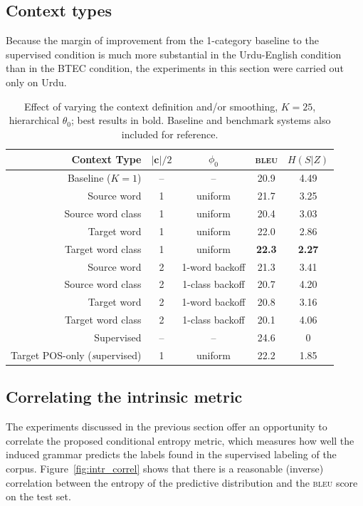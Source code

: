 \subsection{Context types}

Because the margin of improvement from the 1-category baseline to the supervised condition is much more substantial in the Urdu-English condition than in the BTEC condition, the experiments in this section were carried out only on Urdu.


\begin{table}[h]
\caption{Effect of varying the context definition and/or smoothing, $K=25$, hierarchical $\theta_0$; best results in bold. Baseline and benchmark systems also included for reference.}
\begin{center}
\begin{tabular}{r|c|c|c|c}
Context Type & $|\textbf{c}|/2$ & $\phi_0$ & \textsc{bleu} & $H(S|Z)$ \\
\hline
Baseline ($K=1$) & -- & -- & 20.9 &  4.49 \\
\hline
Source word & 1 & uniform & 21.7 & 3.25 \\
Source word class & 1 & uniform & 20.4 & 3.03 \\
Target word & 1 & uniform & 22.0 & 2.86 \\
Target word class & 1 & uniform & \textbf{22.3} & \textbf{2.27} \\
Source word & 2 & 1-word backoff & 21.3 & 3.41 \\
Source word class & 2 & 1-class backoff & 20.7 & 4.20 \\
Target word & 2 & 1-word backoff & 20.8 & 3.16 \\
Target word class & 2 & 1-class backoff & 20.1 & 4.06 \\
\hline
Supervised \citep{samt} & -- & -- & 24.6 & 0 \\
Target POS-only ({\emph supervised}) & 1 & uniform & 22.2 & 1.85 \\
\end{tabular}
\end{center}
\label{tab:npbaselines}
\end{table}%

\subsection{Correlating the intrinsic metric}

The experiments discussed in the previous section offer an opportunity to correlate the proposed conditional entropy metric, which measures how well the induced grammar predicts the labels found in the supervised labeling of the corpus.  Figure~\ref{fig:intr_correl} shows that there is a reasonable (inverse) correlation between the entropy of the predictive distribution and the \textsc{bleu} score on the test set.

